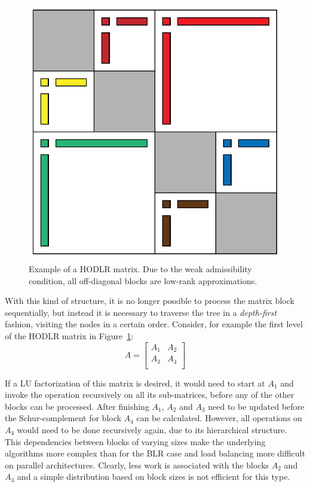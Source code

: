 \begin{figure}[h]
    \centering
    \includegraphics[width=0.6\linewidth]{chapters/4_hierarchical_matrices/figures/HODLR.pdf}
    \caption[Hierarchical Off-Diagonal Low-Rank Matrix]{Example of a HODLR matrix. Due to the weak admissibility condition, all off-diagonal blocks are low-rank approximations.}
    \label{fig:hodlr}
\end{figure}

With this kind of structure, it is no longer possible to process the matrix block sequentially, but instead it is necessary to traverse the tree in a \textit{depth-first} fashion, visiting the nodes in a certain order. Consider, for example the first level of the HODLR matrix in Figure~\hyperref[fig:hodlr]{\ref{fig:hodlr}}:
\begin{equation}
  A = 
  \left[
    \begin{array}{cc}
      A_1& A_2 \\
      A_3 & A_4 \\
    \end{array}
  \right]
\end{equation}

\noindent If a LU factorization of this matrix is desired, it would need to start at $A_1$ and invoke the operation recursively on all its sub-matrices, before any of the other blocks can be processed. After finishing $A_1$, $A_2$ and $A_3$ need to be updated before the Schur-complement for block $A_4$ can be calculated. However, all operations on $A_4$ would need to be done recursively again, due to its hierarchical structure. This dependencies between blocks of varying sizes make the underlying algorithms more complex than for the BLR case and load balancing more difficult on parallel architectures. Clearly, less work is associated with the blocks $A_2$ and $A_3$ and a simple distribution based on block sizes is not efficient for this type.

